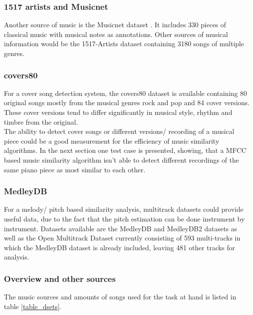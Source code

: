 \subsubsection{1517 artists and Musicnet}

Another source of music is the Musicnet dataset \cite{musicnet1}. It includes 330 pieces of classical music with musical notes as annotations. Other sources of musical information would be the 1517-Artists dataset containing 3180 songs of multiple genres. \cite{1517artists1}

\subsubsection{covers80}

For a cover song detection system, the covers80 dataset is available \cite{cover80} containing 80 original songs mostly from the musical genres rock and pop and 84 cover versions. These cover versions tend to differ significantly in musical style, rhythm and timbre from the original.\\
The ability to detect cover songs or different versions/ recording of a musical piece could be a good measurement for the efficiency of music similarity algorithms. In the next section one test case is presented, showing, that a MFCC based music similarity algorithm isn't able to detect different recordings of the same piano piece as most similar to each other. 

\subsubsection{MedleyDB}

For a melody/ pitch based similarity analysis, multitrack datasets could provide useful data, due to the fact that the pitch estimation can be done instrument by instrument. 
Datasets available are the MedleyDB \cite{medleydb1} and MedleyDB2 \cite{medleydb2} datasets as well as the Open Multitrack Dataset \cite{openmult1} currently consisting of 593 multi-tracks in which the MedleyDB dataset is already included, leaving 481 other tracks for analysis.

\subsubsection{Overview and other sources}

The music sources and amounts of songs used for the task at hand is listed in table \ref{table_dsets}.

